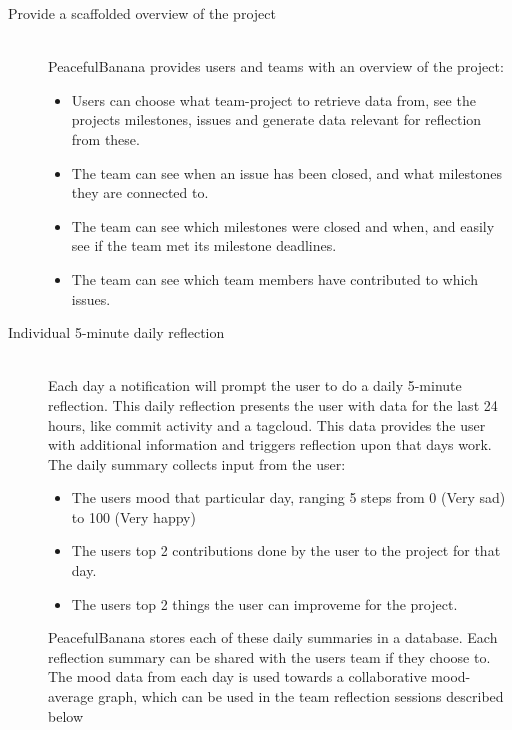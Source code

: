 \begin{description}
	\item[Provide a scaffolded overview of the project] \hfill \\
	PeacefulBanana provides users and teams with an overview of the project:
	\begin{itemize}
		\item Users can choose what team-project to retrieve data from, see the projects milestones, issues and generate data relevant for reflection from these.
		\item The team can see when an issue has been closed, and what milestones they are connected to.
		\item The team can see which milestones were closed and when, and easily see if the team met its milestone deadlines. 
		\item The team can see which team members have contributed to which issues.
	\end{itemize}

	\item[Individual 5-minute daily reflection] \hfill \\
	Each day a notification will prompt the user to do a daily 5-minute reflection. This daily reflection presents the user with data for the last 24 hours, like commit activity and a tagcloud. This data provides the user with additional information and triggers reflection upon that days work. The daily summary collects input from the user:
	\begin{itemize}
		\item The users mood that particular day, ranging 5 steps from 0 (Very sad) to 100 (Very happy)
		\item The users top 2 contributions done by the user to the project for that day.
		\item The users top 2 things the user can improveme for the project.
	\end{itemize}
	PeacefulBanana stores each of these daily summaries in a database. Each reflection summary can be shared with the users team if they choose to. The mood data from each day is used towards a collaborative mood-average graph, which can be used in the team reflection sessions described below


\end{description}
